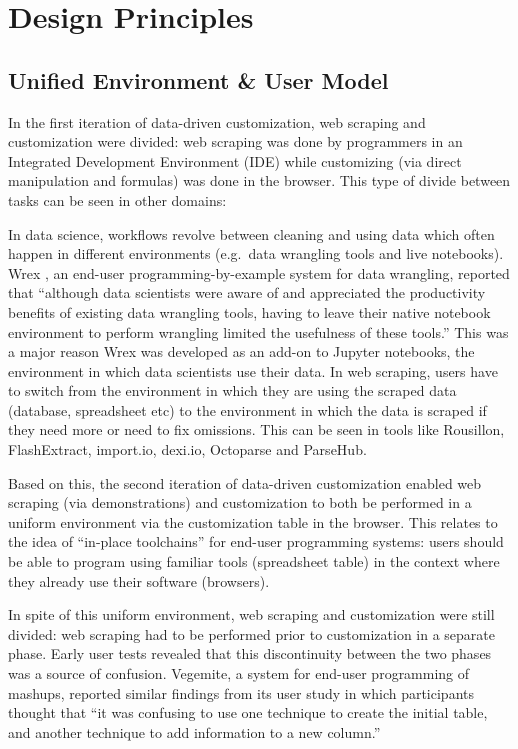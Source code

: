 \documentclass[sigconf,10pt]{acmart}
\begin{document}
\hypertarget{sec:design-principles}{%
\section{Design Principles}\label{sec:design-principles}}

\hypertarget{unified-environment-user-model}{%
\subsection{Unified Environment \& User
Model}\label{unified-environment-user-model}}

In the first iteration of data-driven customization, web scraping and
customization were divided: web scraping was done by programmers in an
Integrated Development Environment (IDE) while customizing (via direct
manipulation and formulas) was done in the browser. This type of divide
between tasks can be seen in other domains:

In data science, workflows revolve between cleaning and using data which
often happen in different environments (e.g.~data wrangling tools and
live notebooks). Wrex \citep{drosos2020}, an end-user
programming-by-example system for data wrangling, reported that
``although data scientists were aware of and appreciated the
productivity benefits of existing data wrangling tools, having to leave
their native notebook environment to perform wrangling limited the
usefulness of these tools.'' This was a major reason Wrex was developed
as an add-on to Jupyter notebooks, the environment in which data
scientists use their data. In web scraping, users have to switch from
the environment in which they are using the scraped data (database,
spreadsheet etc) to the environment in which the data is scraped if they
need more or need to fix omissions. This can be seen in tools like
Rousillon, FlashExtract, import.io, dexi.io, Octoparse and ParseHub.

Based on this, the second iteration of data-driven customization enabled
web scraping (via demonstrations) and customization to both be performed
in a uniform environment via the customization table in the browser.
This relates to the idea of ``in-place toolchains'' for end-user
programming systems: users should be able to program using familiar
tools (spreadsheet table) in the context where they already use their
software (browsers).

In spite of this uniform environment, web scraping and customization
were still divided: web scraping had to be performed prior to
customization in a separate phase. Early user tests revealed that this
discontinuity between the two phases was a source of confusion.
Vegemite, a system for end-user programming of mashups, reported similar
findings from its user study in which participants thought that ``it was
confusing to use one technique to create the initial table, and another
technique to add information to a new column.''
\end{document}
